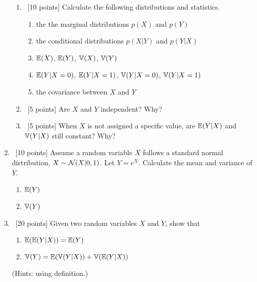 \documentclass[12pt, fullpage,letterpaper]{article}
\begin{document}
\begin{enumerate}
        \begin{enumerate}
            \item~[10 points] Calculate the following distributions and statistics. 
            \begin{enumerate}
            \item the the marginal distributions $p(X)$ and $p(Y)$
            \item the conditional distributions $p(X|Y)$ and $p(Y|X)$
            \item $\mathbb{E}(X)$, $\mathbb{E}(Y)$, $\mathbb{V}(X)$, $\mathbb{V}(Y)$
            \item  $\mathbb{E}(Y|X=0)$, $\mathbb{E}(Y|X=1)$,  $\mathbb{V}(Y|X=0)$, $\mathbb{V}(Y|X=1)$ 
            \item  the covariance between $X$ and $Y$
            \end{enumerate}
            \item~[5 points] Are $X$ and $Y$ independent? Why?
            \item~[5 points] When $X$ is not assigned a specific value, are $\mathbb{E}(Y|X)$ and $\mathbb{V}(Y|X)$ still constant? Why?
        \end{enumerate}
\item~[10 points] Assume a random variable $X$ follows a standard normal distribution, \ie $X \sim \mathcal{N}(X|0, 1)$. Let $Y = e^X$. Calculate the mean and variance of $Y$.
\begin{enumerate}
	\item $\mathbb{E}(Y)$
	\item $\mathbb{V}(Y)$
\end{enumerate}

\item~[20 points]  Given two random variables $X$ and $Y$, show that 
\begin{enumerate}
\item $\mathbb{E}(\mathbb{E}(Y|X)) = \mathbb{E}(Y)$
\item
$\mathbb{V}(Y) = \mathbb{E}(\mathbb{V}(Y|X)) + \mathbb{V}(\mathbb{E}(Y|X))$
\end{enumerate}
(Hints: using definition.)



\end{enumerate}
\end{document}
